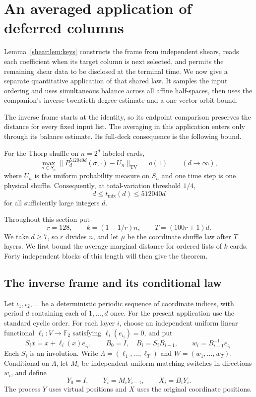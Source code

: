 \section{An averaged application of deferred columns}
\label{frames:aux:section}

Lemma~\ref{shear:lem:keys} constructs the frame from independent shears,
reads each coefficient when its target column is next selected, and
permits the remaining shear data to be disclosed at the terminal time.
We now give a separate quantitative application of that shared law.
It samples the input ordering and uses simultaneous balance across
all affine half-spaces, then uses the companion's inverse-twentieth
degree estimate and a one-vector orbit bound.

The inverse frame starts at the identity, so its endpoint comparison
preserves the distance for every fixed input list. The averaging in this
application enters only through its balance estimate. Its full-deck
consequence is the following bound.

\begin{theorem}\label{frames:aux:theorem}
For the Thorp shuffle on $n=2^d$ labeled cards,
\[
 \max_{\sigma\in S_n}
 \bigl\|P_d^{512040d}(\sigma,\cdot)-U_n\bigr\|_{\mathrm{TV}}
 =o(1)\qquad(d\longrightarrow\infty),
\]
where $U_n$ is the uniform probability measure on $S_n$ and one time step is
one physical shuffle. Consequently, at total-variation threshold $1/4$,
\[
 d\le t_{\mathrm{mix}}(d)\le512040d
\]
for all sufficiently large integers $d$.
\end{theorem}

Throughout this section put
\begin{equation}\label{frames:aux:parameters}
 r=128,\qquad k=(1-1/r)n,\qquad T=(100r+1)d.
\end{equation}
We take $d\ge7$, so $r$ divides $n$, and let $\mu$ be the coordinate
shuffle law after $T$ layers. We first bound the average marginal distance
for ordered lists of $k$ cards. Forty independent blocks of this length
will then give the theorem.

\subsection{The inverse frame and its conditional law}

Let $\iota_1,\iota_2,\ldots$ be a deterministic periodic sequence of
coordinate indices, with period $d$ containing each of $1,\ldots,d$
once. For the present application use the standard cyclic order. For
each layer $i$, choose an independent uniform linear functional
$\ell_i:V\to\mathbb F_2$ satisfying $\ell_i(e_{\iota_i})=0$, and put
\begin{equation}\label{frames:aux:transvections}
 S_i x=x+\ell_i(x)e_{\iota_i},\qquad
 B_0=I,\quad B_i=S_iB_{i-1},\qquad
 w_i=B_{i-1}^{-1}e_{\iota_i}.
\end{equation}
Each $S_i$ is an involution. Write
$\Lambda=(\ell_1,\ldots,\ell_T)$ and $W=(w_1,\ldots,w_T)$.
Conditional on $\Lambda$, let $M_i$ be independent uniform matching
switches in directions $w_i$, and define
\[
 Y_0=I,\qquad Y_i=M_iY_{i-1},\qquad X_i=B_iY_i.
\]
The process $Y$ uses virtual positions and $X$ uses the original
coordinate positions.

